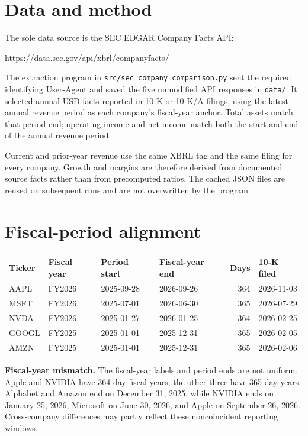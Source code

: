 \documentclass[11pt]{article}
\begin{document}
\section*{Data and method}

The sole data source is the SEC EDGAR Company Facts API:
\begin{center}
    \url{https://data.sec.gov/api/xbrl/companyfacts/}
\end{center}

The extraction program in \texttt{src/sec\_company\_comparison.py} sent the required identifying User-Agent and saved the five unmodified API responses in \texttt{data/}. It selected annual USD facts reported in 10-K or 10-K/A filings, using the latest annual revenue period as each company's fiscal-year anchor. Total assets match that period end; operating income and net income match both the start and end of the annual revenue period.

Current and prior-year revenue use the same XBRL tag and the same filing for every company. Growth and margins are therefore derived from documented source facts rather than from precomputed ratios. The cached JSON files are reused on subsequent runs and are not overwritten by the program.

\section*{Fiscal-period alignment}

\begin{center}
\small
\begin{tabular}{@{}llllrl@{}}
\toprule
Ticker & Fiscal year & Period start & Fiscal-year end & Days & 10-K filed \\
\midrule
AAPL & FY2026 & 2025-09-28 & 2026-09-26 & 364 & 2026-11-03 \\
MSFT & FY2026 & 2025-07-01 & 2026-06-30 & 365 & 2026-07-29 \\
NVDA & FY2026 & 2025-01-27 & 2026-01-25 & 364 & 2026-02-25 \\
GOOGL & FY2025 & 2025-01-01 & 2025-12-31 & 365 & 2026-02-05 \\
AMZN & FY2025 & 2025-01-01 & 2025-12-31 & 365 & 2026-02-06 \\
\bottomrule
\end{tabular}
\end{center}

\textbf{Fiscal-year mismatch.} The fiscal-year labels and period ends are not uniform. Apple and NVIDIA have 364-day fiscal years; the other three have 365-day years. Alphabet and Amazon end on December 31, 2025, while NVIDIA ends on January 25, 2026, Microsoft on June 30, 2026, and Apple on September 26, 2026. Cross-company differences may partly reflect these noncoincident reporting windows.
\end{document}

